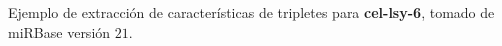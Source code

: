 \label{triplet}
Ejemplo de extracción de características de tripletes para
\textbf{cel-lsy-6}, tomado de miRBase versión $21$.

